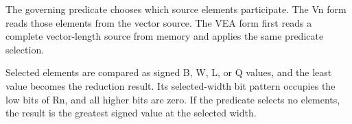The governing predicate chooses which source elements participate. The Vn form
reads those elements from the vector source. The VEA form first reads a complete
vector-length source from memory and applies the same predicate selection.

Selected elements are compared as signed B, W, L, or Q values, and the least
value becomes the reduction result. Its selected-width bit pattern occupies the
low bits of Rn, and all higher bits are zero. If the predicate selects no
elements, the result is the greatest signed value at the selected width.
